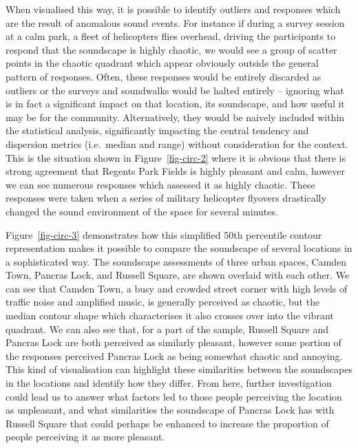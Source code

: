 \documentclass[
  authoryear,
  preprint,
  3p]{elsarticle}
\begin{document}
When visualised this way, it is possible to identify outliers and
responses which are the result of anomalous sound events. For instance
if during a survey session at a calm park, a fleet of helicopters flies
overhead, driving the participants to respond that the soundscape is
highly chaotic, we would see a group of scatter points in the chaotic
quadrant which appear obviously outside the general pattern of
responses. Often, these responses would be entirely discarded as
outliers or the surveys and soundwalks would be halted entirely --
ignoring what is in fact a significant impact on that location, its
soundscape, and how useful it may be for the community. Alternatively,
they would be naively included within the statistical analysis,
significantly impacting the central tendency and dispersion metrics
(i.e.~median and range) without consideration for the context. This is
the situation shown in Figure~\ref{fig-circ-2} where it is obvious that
there is strong agreement that Regents Park Fields is highly pleasant
and calm, however we can see numerous responses which assessed it as
highly chaotic. These responses were taken when a series of military
helicopter flyovers drastically changed the sound environment of the
space for several minutes.

Figure~\ref{fig-circ-3} demonstrates how this simplified 50th percentile
contour representation makes it possible to compare the soundscape of
several locations in a sophisticated way. The soundscape assessments of
three urban spaces, Camden Town, Pancras Lock, and Russell Square, are
shown overlaid with each other. We can see that Camden Town, a busy and
crowded street corner with high levels of traffic noise and amplified
music, is generally perceived as chaotic, but the median contour shape
which characterises it also crosses over into the vibrant quadrant. We
can also see that, for a part of the sample, Russell Square and Pancras
Lock are both perceived as similarly pleasant, however some portion of
the responses perceived Pancras Lock as being somewhat chaotic and
annoying. This kind of visualisation can highlight these similarities
between the soundscapes in the locations and identify how they differ.
From here, further investigation could lead us to answer what factors
led to those people perceiving the location as unpleasant, and what
similarities the soundscape of Pancras Lock has with Russell Square that
could perhaps be enhanced to increase the proportion of people
perceiving it as more pleasant.
\end{document}
